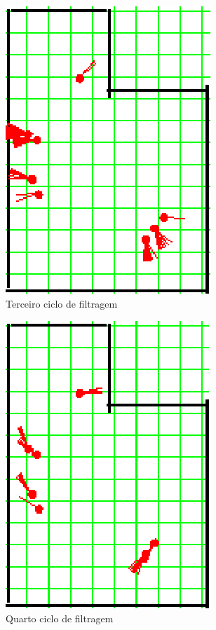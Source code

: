 \begin{figure}[H]
  \centering
  \includegraphics[scale=1]{figuras/cen4_ex4/4.eps}
  \caption[Terceiro Ciclo de Filtragem]{Terceiro ciclo de filtragem}
  \label{img:cen4_ex4_4}
\end{figure}

\begin{figure}[H]
  \centering
  \includegraphics[scale=1]{figuras/cen4_ex4/5.eps}
  \caption[Quarto Ciclo de Filtragem]{Quarto ciclo de filtragem}
  \label{img:cen4_ex4_5}
\end{figure}

